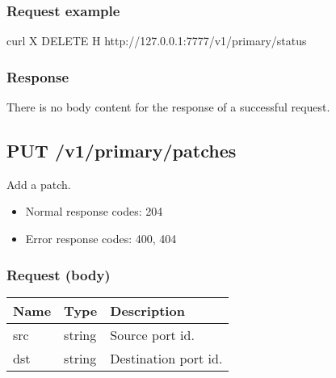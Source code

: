 \documentclass[a4paper,11pt,openany,oneside,english]{sphinxmanual}
\begin{document}
\subsubsection{Request example}
\label{\detokenize{api_ref/spp_primary:id6}}
\begin{sphinxVerbatim}[commandchars=\\\{\},formatcom=\footnotesize]
 curl \PYGZhy{}X DELETE \PYGZhy{}H  
  http://127.0.0.1:7777/v1/primary/status
\end{sphinxVerbatim}


\subsubsection{Response}
\label{\detokenize{api_ref/spp_primary:id7}}
There is no body content for the response of a successful  request.


\subsection{PUT /v1/primary/patches}
\label{\detokenize{api_ref/spp_primary:put-v1-primary-patches}}
Add a patch.
\begin{itemize}
\item {} 
Normal response codes: 204

\item {} 
Error response codes: 400, 404

\end{itemize}


\subsubsection{Request (body)}
\label{\detokenize{api_ref/spp_primary:id8}}

\begin{savenotes}\sphinxattablestart
\centering
{}
\sphinxthecaptionisattop
{}\label{\detokenize{api_ref/spp_primary:id38}}\label{\detokenize{api_ref/spp_primary:table-spp-ctl-spp-primary-ports-patches-body}}
\sphinxaftertopcaption
\begin{tabulary}{\linewidth}[t]{|T|T|T|}
\hline
\sphinxstyletheadfamily 
Name
&\sphinxstyletheadfamily 
Type
&\sphinxstyletheadfamily 
Description
\\
\hline
src
&
string
&
Source port id.
\\
\hline
dst
&
string
&
Destination port id.
\\
\hline
\end{tabulary}
\par
\sphinxattableend\end{savenotes}
\end{document}

